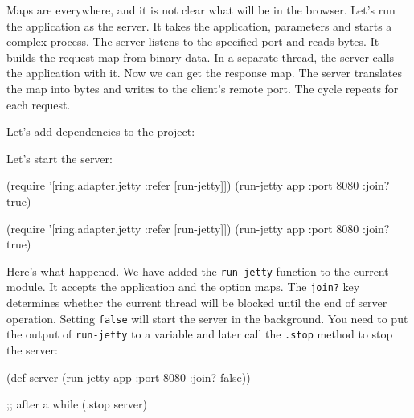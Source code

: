 \fi


Maps are everywhere, and it is not clear what will be in the browser. Let's run the application as the server. It takes the application, parameters and starts a complex process. The server listens to the specified port and reads bytes. It builds the request map from binary data. In a separate thread, the server calls the application with it. Now we can get the response map. The server translates the map into bytes and writes to the client's remote port. The cycle repeats for each request.


Let's add dependencies to the project:

\begin{english}
  \begin{clojure}
  \end{clojure}
\end{english}

Let's start the server:

\ifx\DEVICETYPE\MOBILE

\begin{english}
  \begin{clojure}
(require '[ring.adapter.jetty
           :refer [run-jetty]])
(run-jetty app {:port 8080 :join? true})
  \end{clojure}
\end{english}

\else

\begin{english}
  \begin{clojure}
(require '[ring.adapter.jetty :refer [run-jetty]])
(run-jetty app {:port 8080 :join? true})
  \end{clojure}
\end{english}

\fi

Here's what happened. We have added the \verb|run-jetty| function to the current module. It accepts the application and the option maps. The \verb|join?| key determines whether the current thread will be blocked until the end of server operation. Setting \verb|false| will start the server in the background. You need to put the output of \verb|run-jetty| to a variable and later call the \verb|.stop| method to stop the server:

\ifx\DEVICETYPE\MOBILE

\begin{english}
  \begin{clojure}
(def server
  (run-jetty app {:port 8080
                  :join? false}))

;; after a while
(.stop server)
  \end{clojure}
\end{english}

